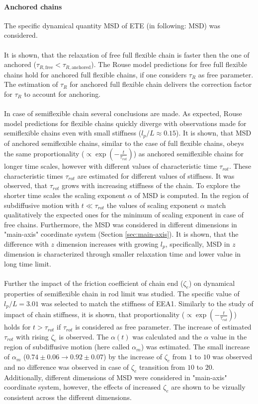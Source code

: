 \documentclass[
    paper=A4,pagesize=automedia,fontsize=12pt,
    BCOR=15mm,DIV=22,
    twoside,headinclude,footinclude=false,
    fleqn,             %
    bibliography=totocnumbered,          %
    listof=totoc,                %
    listof=flat,                 %
    cleardoublepage=empty      %
    numbers=endperiod
]{scrartcl}
\begin{document}
\paragraph{Anchored chains}
The specific dynamical quantity MSD of ETE (in following: MSD) was considered.
\\
\\
It is shown,
that the relaxation of free full flexible chain is faster then the one of
anchored ($\tau_{R,\text{free}} < \tau_{R,\text{anchored}}$). The Rouse model predictions
for free full flexible chains hold for anchored full flexible chains, if one considers
$\tau_R$ as free parameter. The estimation of $\tau_R$ for anchored full flexible chain 
delivers the correction factor for $\tau_R$ to account for anchoring.
\\
\\
In case of semiflexible chain several conclusions are made. As expected,
Rouse model predictions for flexible chains quickly diverge with observations made 
for semiflexible chains even with small stiffness ($l_p/L \approx 0.15$).
It is shown, that MSD of anchored semiflexible chains, 
similar to the case of full flexible chains, obeys the same 
proportionality ($\propto \exp\left(-\frac{t}{\tau_{rot}}\right)$) 
as anchored semiflexible chains for longer time scales, however with
different values of characteristic time $\tau_{rot}$. These characteristic times 
$\tau_{rot}$ are estimated for different values of stiffness. It was observed, that 
$\tau_{rot}$ grows with increasing stiffness of the chain. To explore the shorter time
scales the scaling exponent $\alpha$ of MSD is computed. In the region of subdiffusive 
motion with $t\ll\tau_{rot}$ the values of scaling exponent $\alpha$ match
qualitatively the expected ones for the minimum of scaling exponent in case of free chains.
Furthermore, the MSD was considered in different dimensions in "main-axis" coordinate 
system (Section \ref{sec:main-axis}). It is shown, that the difference with $z$ 
dimension increases with growing $l_p$, specifically, MSD in $z$ dimension is 
characterized through smaller relaxation time and lower value in long time limit.
\\
\\
Further the impact of the friction coefficient of chain end ($\zeta_e$) 
on dynamical properties of semiflexible chain in rod limit was studied.
The specific value of $l_p/L=3.01$ was selected to match the stiffness of
EEA1. Similarly to the study of impact of chain stiffness, it is shown,
that proportionality ($\propto \exp\left(-\frac{t}{\tau_{rot}}\right)$) holds
for $t>\tau_{rot}$ if $\tau_{rot}$ is considered as free parameter.
The increase of estimated $\tau_{rot}$ with rising $\zeta_e$ is observed.
The $\alpha(t)$ was calculated and the $\alpha$ value in the region of subdiffusive motion
(here called $\alpha_m$) was estimated. The small
increase of $\alpha_m$
($0.74 \pm 0.06 \rightarrow 0.92 \pm 0.07$) by the 
increase of $\zeta_e$ from $1$ to $10$ was observed and no difference was observed
in case of $\zeta_e$ transition from $10$ to $20$. Additionally, different dimensions
of MSD were considered in "main-axis" coordinate system, however, the effects of 
increased $\zeta_e$ are shown to be vizually consistent across the different dimensions.
\end{document}
